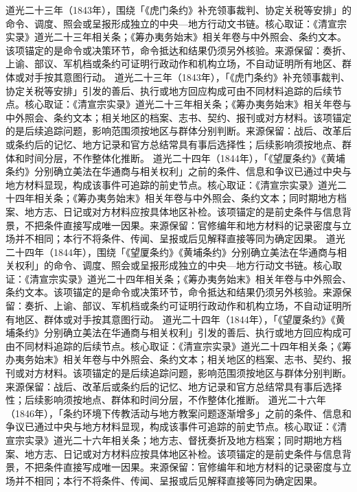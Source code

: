 道光二十三年（1843年），围绕「《虎门条约》补充领事裁判、协定关税等安排」的命令、调度、照会或呈报形成独立的中央—地方行动文书链。核心取证：《清宣宗实录》道光二十三年相关条；《筹办夷务始末》相关年卷与中外照会、条约文本。该项锚定的是命令或决策环节，命令抵达和结果仍须另外核验。来源保留：奏折、上谕、部议、军机档或条约可证明行政动作和机构立场，不自动证明所有地区、群体或对手按其意图行动。
道光二十三年（1843年），「《虎门条约》补充领事裁判、协定关税等安排」引发的善后、执行或地方回应构成可由不同材料追踪的后续节点。核心取证：《清宣宗实录》道光二十三年相关条；《筹办夷务始末》相关年卷与中外照会、条约文本；相关地区的档案、志书、契约、报刊或对方材料。该项锚定的是后续追踪问题，影响范围须按地区与群体分别判断。来源保留：战后、改革后或条约后的记忆、地方记录和官方总结常具有事后选择性；后续影响须按地点、群体和时间分层，不作整体化推断。
道光二十四年（1844年），「《望厦条约》《黄埔条约》分别确立美法在华通商与相关权利」之前的条件、信息和争议已通过中央与地方材料显现，构成该事件可追踪的前史节点。核心取证：《清宣宗实录》道光二十四年相关条；《筹办夷务始末》相关年卷与中外照会、条约文本；同时期地方档案、地方志、日记或对方材料应按具体地区补检。该项锚定的是前史条件与信息背景，不把条件直接写成唯一因果。来源保留：官修编年和地方材料的记录密度与立场并不相同；本行不将条件、传闻、呈报或后见解释直接等同为确定因果。
道光二十四年（1844年），围绕「《望厦条约》《黄埔条约》分别确立美法在华通商与相关权利」的命令、调度、照会或呈报形成独立的中央—地方行动文书链。核心取证：《清宣宗实录》道光二十四年相关条；《筹办夷务始末》相关年卷与中外照会、条约文本。该项锚定的是命令或决策环节，命令抵达和结果仍须另外核验。来源保留：奏折、上谕、部议、军机档或条约可证明行政动作和机构立场，不自动证明所有地区、群体或对手按其意图行动。
道光二十四年（1844年），「《望厦条约》《黄埔条约》分别确立美法在华通商与相关权利」引发的善后、执行或地方回应构成可由不同材料追踪的后续节点。核心取证：《清宣宗实录》道光二十四年相关条；《筹办夷务始末》相关年卷与中外照会、条约文本；相关地区的档案、志书、契约、报刊或对方材料。该项锚定的是后续追踪问题，影响范围须按地区与群体分别判断。来源保留：战后、改革后或条约后的记忆、地方记录和官方总结常具有事后选择性；后续影响须按地点、群体和时间分层，不作整体化推断。
道光二十六年（1846年），「条约环境下传教活动与地方教案问题逐渐增多」之前的条件、信息和争议已通过中央与地方材料显现，构成该事件可追踪的前史节点。核心取证：《清宣宗实录》道光二十六年相关条；地方志、督抚奏折及地方档案；同时期地方档案、地方志、日记或对方材料应按具体地区补检。该项锚定的是前史条件与信息背景，不把条件直接写成唯一因果。来源保留：官修编年和地方材料的记录密度与立场并不相同；本行不将条件、传闻、呈报或后见解释直接等同为确定因果。
